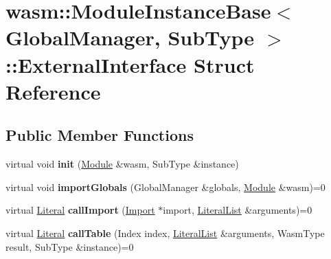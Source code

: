 \hypertarget{structwasm_1_1_module_instance_base_1_1_external_interface}{}\section{wasm\+:\+:Module\+Instance\+Base$<$ Global\+Manager, Sub\+Type $>$\+:\+:External\+Interface Struct Reference}
\label{structwasm_1_1_module_instance_base_1_1_external_interface}
\subsection*{Public Member Functions}
\begin{DoxyCompactItemize}
\item 
\mbox{\label{structwasm_1_1_module_instance_base_1_1_external_interface_a5fa00f9c64d55d2611fa1c4ebaf29f5a}} 
virtual void {\bfseries init} (\mbox{\hyperlink{classwasm_1_1_module}{Module}} \&wasm, Sub\+Type \&instance)
\item 
\mbox{\label{structwasm_1_1_module_instance_base_1_1_external_interface_ac6eac036d7295393ff0724ef8364a129}} 
virtual void {\bfseries import\+Globals} (Global\+Manager \&globals, \mbox{\hyperlink{classwasm_1_1_module}{Module}} \&wasm)=0
\item 
\mbox{\label{structwasm_1_1_module_instance_base_1_1_external_interface_a856e3a42d54327564026e49277b7fb9d}} 
virtual \mbox{\hyperlink{classwasm_1_1_literal}{Literal}} {\bfseries call\+Import} (\mbox{\hyperlink{classwasm_1_1_import}{Import}} $\ast$import, \mbox{\hyperlink{classstd_1_1vector}{Literal\+List}} \&arguments)=0
\item 
\mbox{\label{structwasm_1_1_module_instance_base_1_1_external_interface_af5590d03849538f53d96140e651a4c07}} 
virtual \mbox{\hyperlink{classwasm_1_1_literal}{Literal}} {\bfseries call\+Table} (Index index, \mbox{\hyperlink{classstd_1_1vector}{Literal\+List}} \&arguments, Wasm\+Type result, Sub\+Type \&instance)=0
\item 

\end{DoxyCompactItemize}

